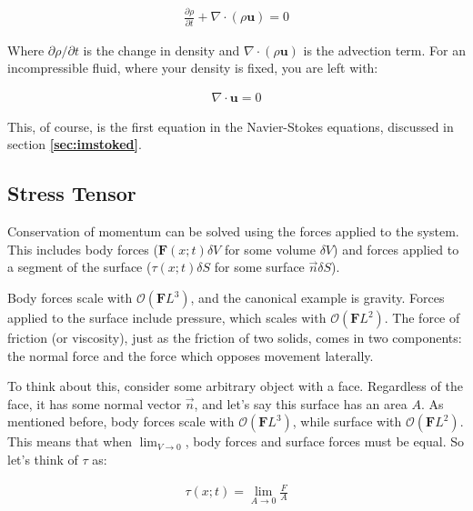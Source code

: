 \begin{equation} \label{phenom1}
\begin{split}
\frac{\partial \rho}{\partial t} + \nabla \cdot (\rho \mathbf{u}) = 0
\end{split}
\end{equation}

Where $\partial \rho / \partial t$ is the change in density and $\nabla \cdot (\rho \mathbf{u})$ is the advection term. For an incompressible fluid, where your density is fixed, you are left with:

\begin{equation} \label{phenom1}
\begin{split}
 \nabla \cdot \mathbf{u} = 0
\end{split}
\end{equation}

This, of course, is the first equation in the Navier-Stokes equations, discussed in section \textbf{\ref{sec:imstoked}}.\newline

\subsection{Stress Tensor}

Conservation of momentum can be solved using the forces applied to the system. This includes body forces ($\mathbf{F}(x;t)\delta V$ for some volume $\delta V$) and forces applied to a segment of the surface ($\tau(x;t)\delta S$ for some surface $\Vec{n}\delta S$).\newline 

Body forces scale with $\mathcal{O} (\mathbf{F}L^3)$, and the canonical example is gravity. Forces applied to the surface include pressure, which scales with $\mathcal{O} (\mathbf{F}L^2)$. The force of friction (or viscosity), just as the friction of two solids, comes in two components: the normal force and the force which opposes movement laterally. \newline

To think about this, consider some arbitrary object with a face. Regardless of the face, it has some normal vector $\Vec{n}$, and let's say this surface has an area $A$. As mentioned before, body forces scale with $\mathcal{O} (\mathbf{F}L^3)$, while surface with $\mathcal{O} (\mathbf{F}L^2)$. This means that when $\lim_{V\to 0}$, body forces and surface forces must be equal. So let's think of $\tau$ as:

\begin{equation} \label{phenom1}
\begin{split}
 \tau(x;t) = \lim_{A\to 0}\frac{F}{A}
\end{split}
\end{equation}

